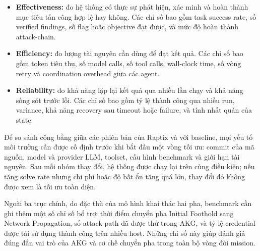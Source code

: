 \begin{itemize}
    \item \textbf{Effectiveness:} đo hệ thống có thực sự phát hiện, xác minh và hoàn thành mục tiêu tấn công hợp lệ hay không. Các chỉ số bao gồm task success rate, số verified findings, số flag hoặc objective đạt được, và mức độ hoàn thành attack-chain.
    \item \textbf{Efficiency:} đo lượng tài nguyên cần dùng để đạt kết quả. Các chỉ số bao gồm token tiêu thụ, số model calls, số tool calls, wall-clock time, số vòng retry và coordination overhead giữa các agent.
    \item \textbf{Reliability:} đo khả năng lặp lại kết quả qua nhiều lần chạy và khả năng sống sót trước lỗi. Các chỉ số bao gồm tỷ lệ thành công qua nhiều run, variance, khả năng recovery sau timeout hoặc failure, và tính nhất quán của state.
\end{itemize}

Để so sánh công bằng giữa các phiên bản của Raptix và với baseline, mọi yếu tố môi trường cần được cố định trước khi bắt đầu một vòng tối ưu: commit của mã nguồn, model và provider LLM, toolset, cấu hình benchmark và giới hạn tài nguyên. Sau mỗi nhóm thay đổi, hệ thống được chạy lại trên cùng điều kiện; nếu tăng solve rate nhưng chi phí hoặc độ bất ổn tăng quá lớn, thay đổi đó không được xem là tối ưu toàn diện.

Ngoài ba trục chính, do đặc thù của mô hình khai thác hai pha, benchmark cần ghi thêm một số chỉ số bổ trợ: thời điểm chuyển pha Initial Foothold sang Network Propagation, số attack path đã được thử trong AKG, và tỷ lệ credential được tái sử dụng thành công trên nhiều host. Những chỉ số này giúp đánh giá đúng đắn vai trò của AKG và cơ chế chuyển pha trong toàn bộ vòng đời mission.